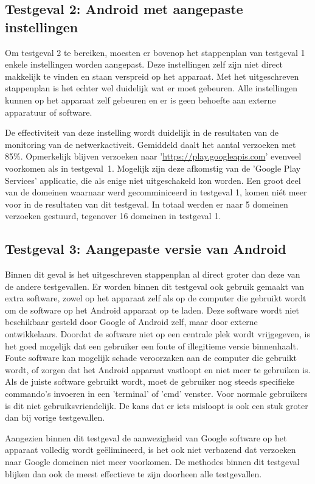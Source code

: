 \subsection{Testgeval 2: Android met aangepaste instellingen}
Om testgeval 2 te bereiken, moesten er bovenop het stappenplan van testgeval 1 enkele instellingen worden aangepast. Deze instellingen zelf zijn niet direct makkelijk te vinden en staan verspreid op het apparaat. Met het uitgeschreven stappenplan is het echter wel duidelijk wat er moet gebeuren. Alle instellingen kunnen op het apparaat zelf gebeuren en er is geen behoefte aan externe apparatuur of software.

De effectiviteit van deze instelling wordt duidelijk in de resultaten van de monitoring van de netwerkactiveit. Gemiddeld daalt het aantal verzoeken met 85\%. Opmerkelijk blijven verzoeken naar '\url{https://play.googleapis.com}' evenveel voorkomen als in testgeval~1. Mogelijk zijn deze afkomstig van de 'Google Play Services' applicatie, die als enige niet uitgeschakeld kon worden. Een groot deel van de domeinen waarnaar werd gecomminiceerd in testgeval 1, komen niét meer voor in de resultaten van dit testgeval. In totaal werden er naar 5 domeinen verzoeken gestuurd, tegenover 16 domeinen in testgeval 1.

\subsection{Testgeval 3: Aangepaste versie van Android}
Binnen dit geval is het uitgeschreven stappenplan al direct groter dan deze van de andere testgevallen. Er worden binnen dit testgeval ook gebruik gemaakt van extra software, zowel op het apparaat zelf als op de computer die gebruikt wordt om de software op het Android apparaat op te laden. Deze software wordt niet beschikbaar gesteld door Google of Android zelf, maar door externe ontwikkelaars. Doordat de software niet op een centrale plek wordt vrijgegeven, is het goed mogelijk dat een gebruiker een foute of illegitieme versie binnenhaalt. Foute software kan mogelijk schade veroorzaken aan de computer die gebruikt wordt, of zorgen dat het Android apparaat vastloopt en niet meer te gebruiken is. Als de juiste software gebruikt wordt, moet de gebruiker nog steeds specifieke commando's invoeren in een 'terminal' of 'cmd' venster. Voor normale gebruikers is dit niet gebruiksvriendelijk. De kans dat er iets misloopt is ook een stuk groter dan bij vorige testgevallen.

Aangezien binnen dit testgeval de aanwezigheid van Google software op het apparaat volledig wordt geëlimineerd, is het ook niet verbazend dat  verzoeken naar Google domeinen niet meer voorkomen. De methodes binnen dit testgeval blijken dan ook de meest effectieve te zijn doorheen alle testgevallen. 

